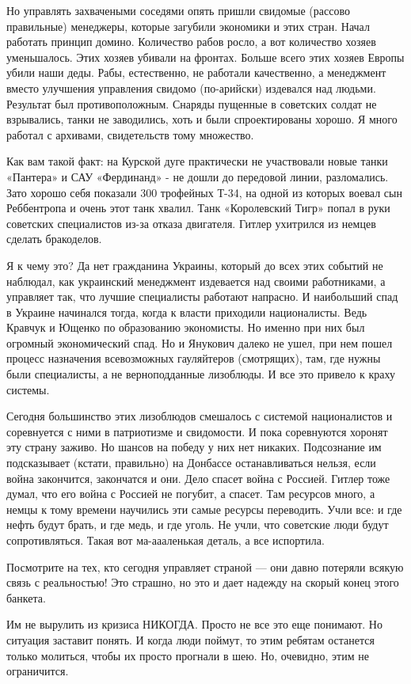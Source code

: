 Но управлять захвачеными соседями опять пришли свидомые (рассово правильные)
менеджеры, которые загубили экономики и этих стран. Начал работать принцип
домино.  Количество рабов росло, а вот количество хозяев уменьшалось. Этих
хозяев убивали на фронтах. Больше всего этих хозяев Европы убили наши деды.
Рабы, естественно, не работали качественно, а менеджмент вместо улучшения
управления свидомо (по-арийски)  издевался над людьми. Результат был
противоположным.  Снаряды пущенные в советских солдат не взрывались, танки не
заводились, хоть и были спроектированы хорошо. Я много работал с архивами,
свидетельств тому множество. 

Как вам такой факт: на Курской дуге практически не участвовали новые танки
«Пантера» и САУ «Фердинанд» - не дошли до передовой линии, разломались.  Зато
хорошо себя показали 300 трофейных Т-34, на одной из которых воевал сын
Реббентропа и очень этот танк хвалил. Танк «Королевский Тигр» попал в руки
советских специалистов из-за отказа двигателя. Гитлер ухитрился из немцев
сделать бракоделов. 

Я к чему это? Да нет гражданина Украины, который до всех этих событий не
наблюдал, как украинский менеджмент издевается над своими работниками, а
управляет так, что лучшие специалисты работают напрасно. И наибольший спад в
Украине начинался тогда, когда к власти приходили националисты. Ведь Кравчук и
Ющенко по образованию экономисты. Но именно при них был огромный экономический
спад. Но и Янукович далеко не ушел, при нем пошел процесс назначения
всевозможных гауляйтеров (смотрящих), там, где нужны были специалисты, а не
верноподданные лизоблюды. И все это привело к краху системы. 

Сегодня большинство этих лизоблюдов смешалось с системой националистов и
соревнуется с ними в патриотизме и свидомости. И пока соревнуются хоронят эту
страну заживо. Но шансов на победу у них нет никаких. Подсознание им
подсказывает (кстати, правильно) на Донбассе останавливаться нельзя, если война
закончится, закончатся и они. Дело спасет война с Россией. Гитлер тоже думал,
что его война с Россией не погубит, а спасет. Там ресурсов много, а немцы к
тому времени научились эти самые ресурсы переводить. Учли все: и где нефть
будут брать, и где медь, и где уголь. Не учли, что советские люди будут
сопротивляться. Такая вот ма-аааленькая деталь, а все испортила. 

Посмотрите на тех, кто сегодня управляет страной — они давно потеряли всякую
связь с реальностью! Это страшно, но это и дает надежду на скорый конец этого
банкета.

Им не вырулить из кризиса НИКОГДА. Просто не все это еще понимают. Но ситуация
заставит понять. И когда люди поймут, то этим ребятам останется только
молиться, чтобы их просто прогнали в шею. Но, очевидно, этим не ограничится.

